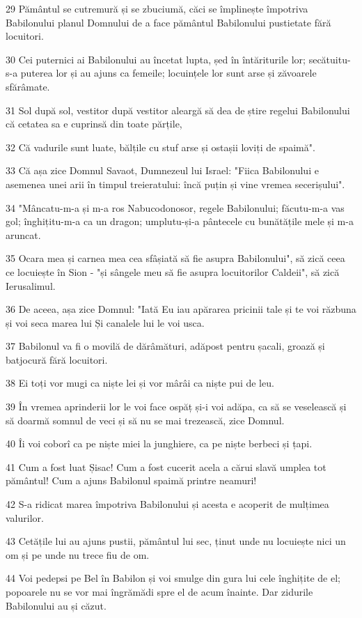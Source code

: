 \par 29 Pământul se cutremură și se zbuciumă, căci se împlinește împotriva Babilonului planul Domnului de a face pământul Babilonului pustietate fără locuitori.
\par 30 Cei puternici ai Babilonului au încetat lupta, șed în întăriturile lor; secătuitu-s-a puterea lor și au ajuns ca femeile; locuințele lor sunt arse și zăvoarele sfărâmate.
\par 31 Sol după sol, vestitor după vestitor aleargă să dea de știre regelui Babilonului că cetatea sa e cuprinsă din toate părțile,
\par 32 Că vadurile sunt luate, bălțile cu stuf arse și ostașii loviți de spaimă".
\par 33 Că așa zice Domnul Savaot, Dumnezeul lui Israel: "Fiica Babilonului e asemenea unei arii în timpul treieratului: încă puțin și vine vremea secerișului".
\par 34 "Mâncatu-m-a și m-a ros Nabucodonosor, regele Babilonului; făcutu-m-a vas gol; înghițitu-m-a ca un dragon; umplutu-și-a pântecele cu bunătățile mele și m-a aruncat.
\par 35 Ocara mea și carnea mea cea sfâșiată să fie asupra Babilonului", să zică ceea ce locuiește în Sion - "și sângele meu să fie asupra locuitorilor Caldeii", să zică Ierusalimul.
\par 36 De aceea, așa zice Domnul: "Iată Eu iau apărarea pricinii tale și te voi răzbuna și voi seca marea lui Și canalele lui le voi usca.
\par 37 Babilonul va fi o movilă de dărâmături, adăpost pentru șacali, groază și batjocură fără locuitori.
\par 38 Ei toți vor mugi ca niște lei și vor mârâi ca niște pui de leu.
\par 39 În vremea aprinderii lor le voi face ospăț și-i voi adăpa, ca să se veselească și să doarmă somnul de veci și să nu se mai trezească, zice Domnul.
\par 40 Îi voi coborî ca pe niște miei la junghiere, ca pe niște berbeci și țapi.
\par 41 Cum a fost luat Șisac! Cum a fost cucerit acela a cărui slavă umplea tot pământul! Cum a ajuns Babilonul spaimă printre neamuri!
\par 42 S-a ridicat marea împotriva Babilonului și acesta e acoperit de mulțimea valurilor.
\par 43 Cetățile lui au ajuns pustii, pământul lui sec, ținut unde nu locuiește nici un om și pe unde nu trece fiu de om.
\par 44 Voi pedepsi pe Bel în Babilon și voi smulge din gura lui cele înghițite de el; popoarele nu se vor mai îngrămădi spre el de acum înainte. Dar zidurile Babilonului au și căzut.
